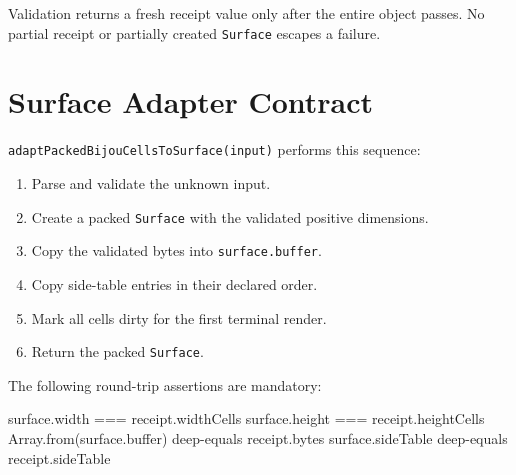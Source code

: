 Validation returns a fresh receipt value only after the entire object passes. No partial receipt or partially created \texttt{S\allowbreak{}u\allowbreak{}r\allowbreak{}f\allowbreak{}a\allowbreak{}c\allowbreak{}e} escapes a failure.

\section{Surface Adapter Contract}\label{record-164-surface-adapter-contract}

\texttt{a\allowbreak{}d\allowbreak{}a\allowbreak{}p\allowbreak{}t\allowbreak{}P\allowbreak{}a\allowbreak{}c\allowbreak{}k\allowbreak{}e\allowbreak{}d\allowbreak{}B\allowbreak{}i\allowbreak{}j\allowbreak{}o\allowbreak{}u\allowbreak{}C\allowbreak{}e\allowbreak{}l\allowbreak{}l\allowbreak{}s\allowbreak{}T\allowbreak{}o\allowbreak{}S\allowbreak{}u\allowbreak{}r\allowbreak{}f\allowbreak{}a\allowbreak{}c\allowbreak{}e\allowbreak{}(\allowbreak{}i\allowbreak{}n\allowbreak{}p\allowbreak{}u\allowbreak{}t\allowbreak{})} performs this sequence:

\begin{enumerate}
\def\labelenumi{\arabic{enumi}.}
\tightlist
\item
  Parse and validate the unknown input.
\item
  Create a packed \texttt{S\allowbreak{}u\allowbreak{}r\allowbreak{}f\allowbreak{}a\allowbreak{}c\allowbreak{}e} with the validated positive dimensions.
\item
  Copy the validated bytes into \texttt{s\allowbreak{}u\allowbreak{}r\allowbreak{}f\allowbreak{}a\allowbreak{}c\allowbreak{}e\allowbreak{}.\allowbreak{}b\allowbreak{}u\allowbreak{}f\allowbreak{}f\allowbreak{}e\allowbreak{}r}.
\item
  Copy side-table entries in their declared order.
\item
  Mark all cells dirty for the first terminal render.
\item
  Return the packed \texttt{S\allowbreak{}u\allowbreak{}r\allowbreak{}f\allowbreak{}a\allowbreak{}c\allowbreak{}e}.
\end{enumerate}

The following round-trip assertions are mandatory:

\begin{CodeBlock}
surface.width === receipt.widthCells
surface.height === receipt.heightCells
Array.from(surface.buffer) deep-equals receipt.bytes
surface.sideTable deep-equals receipt.sideTable
\end{CodeBlock}

